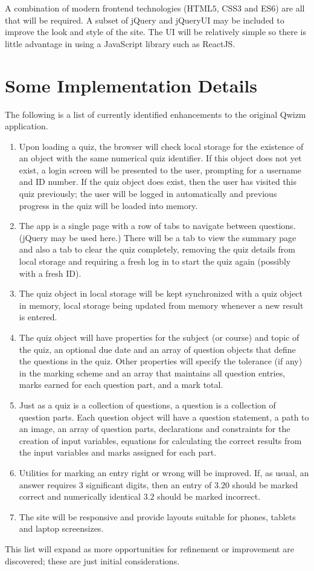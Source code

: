 \documentclass{tufte-handout}
\begin{document}
A combination of modern frontend technologies (HTML$5$, CSS$3$ and ES$6$) are all that will be required. A subset of jQuery and jQueryUI may be included to improve the look and style of the site. The UI will be relatively simple so there is little advantage in using a JavaScript library such as ReactJS.


\section{Some Implementation Details}\label{sec:details}
The following is a list of currently identified enhancements to the original Qwizm application.
\begin{enumerate}
	\item Upon loading a quiz, the browser will check local storage for the existence of an object with the same numerical quiz identifier. If this object does not yet exist, a login screen will be presented to the user, prompting for a username and ID number. If the quiz object does exist, then the user has visited this quiz previously; the user will be logged in automatically and previous progress in the quiz will be loaded into memory.
	\item The app is a single page with a row of tabs to navigate between questions. (jQuery may be used here.) There will be a tab to view the summary page and also a tab to clear the quiz completely, removing the quiz details from local storage and requiring a fresh log in to start the quiz again (possibly with a fresh ID).
	\item The quiz object in local storage will be kept synchronized with a quiz object in memory, local storage being updated from memory whenever a new result is entered.
	\item The quiz object will have properties for the subject (or course) and topic of the quiz, an optional due date and an array of question objects that define the questions in the quiz. Other properties will specify the tolerance (if any) in the marking scheme and an array that maintains all question entries, marks earned for each question part, and a mark total.
	\item Just as a quiz is a collection of questions, a question is a collection of question parts. Each question object will have a question statement, a path to an image, an array of question parts, declarations and constraints for the creation of input variables, equations for calculating the correct results from the input variables and marks assigned for each part.
	\item Utilities for marking an entry right or wrong will be improved. If, as usual, an answer requires 3 significant digits, then an entry of $3.20$ should be marked correct and numerically identical $3.2$ should be marked incorrect.
	\item The site will be responsive and provide layouts suitable for phones, tablets and laptop screensizes.
\end{enumerate}
This list will expand as more opportunities for refinement or improvement are discovered; these are just initial considerations.







\end{document}

